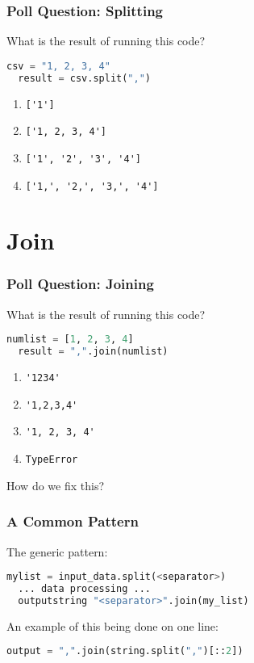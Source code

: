 \documentclass{beamer}
\begin{document}
%
%
\begin{frame}[fragile]
  \frametitle{Poll Question: Splitting}
  What is the result of running this code?
  \begin{lstlisting}[language=Python, autogobble]
  csv = "1, 2, 3, 4"
  result = csv.split(",")
  \end{lstlisting}
  \vfill
  \begin{enumerate}[A]
    \item \lstinline|['1']|
    \item \lstinline|['1, 2, 3, 4']|
    \item \lstinline|['1', '2', '3', '4']|
    \item \lstinline|['1,', '2,', '3,', '4']|
  \end{enumerate}
\end{frame}


\section{Join}

%
%
\begin{frame}[fragile]
  \frametitle{Poll Question: Joining}
  What is the result of running this code?
  \begin{lstlisting}[language=Python, autogobble]
  numlist = [1, 2, 3, 4]
  result = ",".join(numlist)
  \end{lstlisting}
  \vfill
  \begin{enumerate}[A]
    \item \lstinline|'1234'|
    \item \lstinline|'1,2,3,4'|
    \item \lstinline|'1, 2, 3, 4'|
    \item \lstinline|TypeError|
  \end{enumerate}
  \pause
  How do we fix this?
\end{frame}


%
%
\begin{frame}[fragile]
  \frametitle{A Common Pattern}
  The generic pattern:
  \begin{lstlisting}[language=Python, autogobble]
  mylist = input_data.split(<separator>)
  ... data processing ...
  outputstring "<separator>".join(my_list)
  \end{lstlisting}
  \vfill
  An example of this being done on one line:
  \begin{lstlisting}[language=Python, autogobble]
  output = ",".join(string.split(",")[::2])
  \end{lstlisting}
\end{frame}
\end{document}

